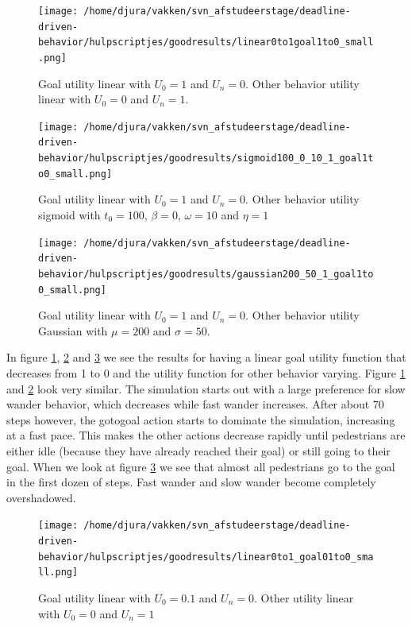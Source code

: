 \documentclass[11pt, a4paper]{book}
\begin{document}
\begin{figure}[h!]
\centering            
\texttt{[image: /home/djura/vakken/svn\_afstudeerstage/deadline-driven-behavior/hulpscriptjes/goodresults/linear0to1goal1to0\_small.png]}
\caption{Goal utility linear with $U_0=1$ and $U_n = 0$. Other behavior utility linear with  $U_0=0$ and $U_n=1$.}
\label{fig:linear0to1goal1to0}
\end{figure} 

\begin{figure}[h!]
\centering
\texttt{[image: /home/djura/vakken/svn\_afstudeerstage/deadline-driven-behavior/hulpscriptjes/goodresults/sigmoid100\_0\_10\_1\_goal1to0\_small.png]}
\caption{Goal utility linear with $U_0=1$ and $U_n = 0$. Other behavior utility sigmoid with $t_0=100$, $\beta=0$, $\omega=10$ and $\eta=1$}
\label{fig:sigmoid100_0_10_1_goal1to0}
\end{figure}

\begin{figure}[h!]
\centering
\texttt{[image: /home/djura/vakken/svn\_afstudeerstage/deadline-driven-behavior/hulpscriptjes/goodresults/gaussian200\_50\_1\_goal1to0\_small.png]}
\caption{Goal utility linear with $U_0=1$ and $U_n = 0$. Other behavior utility Gaussian with $\mu=200$ and $\sigma=50$.}
\label{fig:Gaussian200_50_1_goal1to0}
\end{figure}

In figure \ref{fig:linear0to1goal1to0}, \ref{fig:sigmoid100_0_10_1_goal1to0} and \ref{fig:Gaussian200_50_1_goal1to0} we see the results for having a linear goal utility function that decreases from 1 to 0 and the utility function for other behavior varying. Figure \ref{fig:linear0to1goal1to0} and \ref{fig:sigmoid100_0_10_1_goal1to0} look very similar. The simulation starts out with a large preference for slow wander behavior, which decreases while fast wander increases. After about 70 steps however, the gotogoal action starts to dominate the simulation, increasing at a fast pace. This makes the other actions decrease rapidly until pedestrians are either idle (because they have already reached their goal) or still going to their goal. When we look at figure \ref{fig:Gaussian200_50_1_goal1to0} we see that almost all pedestrians go to the goal in the first dozen of steps. Fast wander and slow wander become completely overshadowed.

\begin{figure}[h!]
\centering
\texttt{[image: /home/djura/vakken/svn\_afstudeerstage/deadline-driven-behavior/hulpscriptjes/goodresults/linear0to1\_goal01to0\_small.png]}
\caption{Goal utility linear with $U_0=0.1$ and $U_n=0$. Other utility linear with $U_0=0$ and $U_n=1$}
\label{fig:linear0to1_goal01to0}
\end{figure}
\end{document}
